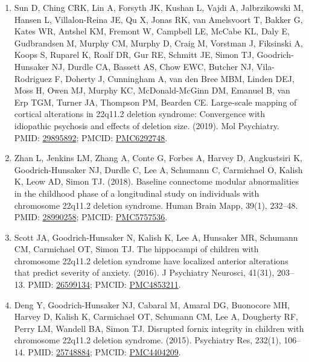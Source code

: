 \documentclass{nihbiosketch}
\begin{document}
\begin{enumerate}
\begin{enumerate}
	      	\item Sun D, Ching CRK, Lin A, Forsyth JK, Kushan L, Vajdi A, Jalbrzikowski M, Hansen L, Villalon-Reina JE, Qu X, Jonas RK, van Amelsvoort T, Bakker G, Kates WR, Antshel KM, Fremont W, Campbell LE, McCabe KL, Daly E, Gudbrandsen M, Murphy CM, Murphy D, Craig M, Vorstman J, Fiksinski A, Koops S, Ruparel K, Roalf DR, Gur RE, Schmitt JE, Simon TJ, Goodrich-Hunsaker NJ, Durdle CA, Bassett AS, Chow EWC, Butcher NJ, Vila-Rodriguez F, Doherty J, Cunningham A, van den Bree MBM, Linden DEJ, Moss H, Owen MJ, Murphy KC, McDonald-McGinn DM, Emanuel B, van Erp TGM, Turner JA, Thompson PM, Bearden CE. Large-scale mapping of cortical alterations in 22q11.2 deletion syndrome: Convergence with idiopathic psychosis and effects of deletion size. (2019). Mol Psychiatry. PMID: \href{https:/pubmed.ncbi.nlm.nih.gov/29895892}{29895892}; PMCID: \href{https://www.ncbi.nlm.nih.gov/pmc/articles/PMC6292748}{PMC6292748}.
	      	
	      	\item Zhan L, Jenkins LM, Zhang A, Conte G, Forbes A, Harvey D, Angkustsiri K, Goodrich-Hunsaker NJ, Durdle C, Lee A, Schumann C, Carmichael O, Kalish K, Leow AD, Simon TJ. (2018). Baseline connectome modular abnormalities in the childhood phase of a longitudinal study on individuals with chromosome 22q11.2 deletion syndrome. Human Brain Mapp, 39(1), 232--48. PMID: \href{https:/pubmed.ncbi.nlm.nih.gov/28990258}{28990258}; PMCID: \href{https://www.ncbi.nlm.nih.gov/pmc/articles/PMC5757536}{PMC5757536}.
	      	
	      	\item Scott JA, Goodrich-Hunsaker N, Kalish K, Lee A, Hunsaker MR, Schumann CM, Carmichael OT, Simon TJ. The hippocampi of children with chromosome 22q11.2 deletion syndrome have localized anterior alterations that predict severity of anxiety. (2016). J Psychiatry Neurosci, 41(31), 203--13. PMID: \href{https:/pubmed.ncbi.nlm.nih.gov/26599134}{26599134}; PMCID: \href{https://www.ncbi.nlm.nih.gov/pmc/articles/PMC4853211}{PMC4853211}.
	      	
	      	\item Deng Y, Goodrich-Hunsaker NJ, Cabaral M, Amaral DG, Buonocore MH, Harvey D, Kalish K, Carmichael OT, Schumann CM, Lee A, Dougherty RF, Perry LM, Wandell BA, Simon TJ. Disrupted fornix integrity in children with chromosome 22q11.2 deletion syndrome. (2015). Psychiatry Res, 232(1), 106--14. PMID: \href{https:/pubmed.ncbi.nlm.nih.gov/25748884}{25748884}; PMCID: \href{https://www.ncbi.nlm.nih.gov/pmc/articles/PMC4404209}{PMC4404209}.
	      	      

\end{enumerate}
\end{enumerate}
\end{document}
